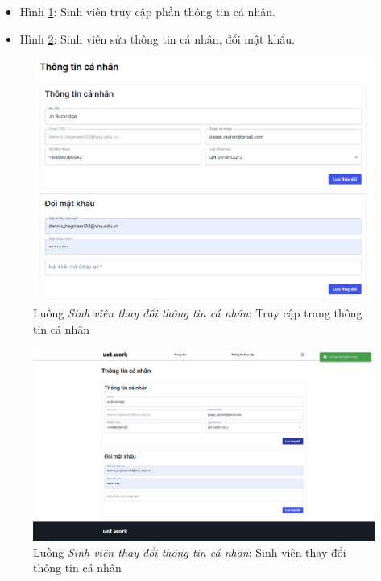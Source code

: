 \documentclass[./../main.tex]{subfiles}
\begin{document}
\begin{itemize}
	\item Hình \ref{fig:student_access_info}: Sinh viên truy cập phần thông tin cá nhân. 
	\item Hình \ref{fig:student_edit_info}: Sinh viên sửa thông tin cá nhân, đổi mật khẩu.
\end{itemize}

\begin{figure}[]
	\includegraphics[width=\linewidth]{./images/image45.png}
	\caption{Luồng \emph{Sinh viên thay đổi thông tin cá nhân}: Truy cập trang thông tin cá nhân}
	\label{fig:student_access_info}
\end{figure}

\begin{figure}[]
	\includegraphics[width=\linewidth]{./images/image46.png}
	\caption{Luồng \emph{Sinh viên thay đổi thông tin cá nhân}: Sinh viên thay đổi thông tin cá nhân}
	\label{fig:student_edit_info}
\end{figure}
\end{document}
